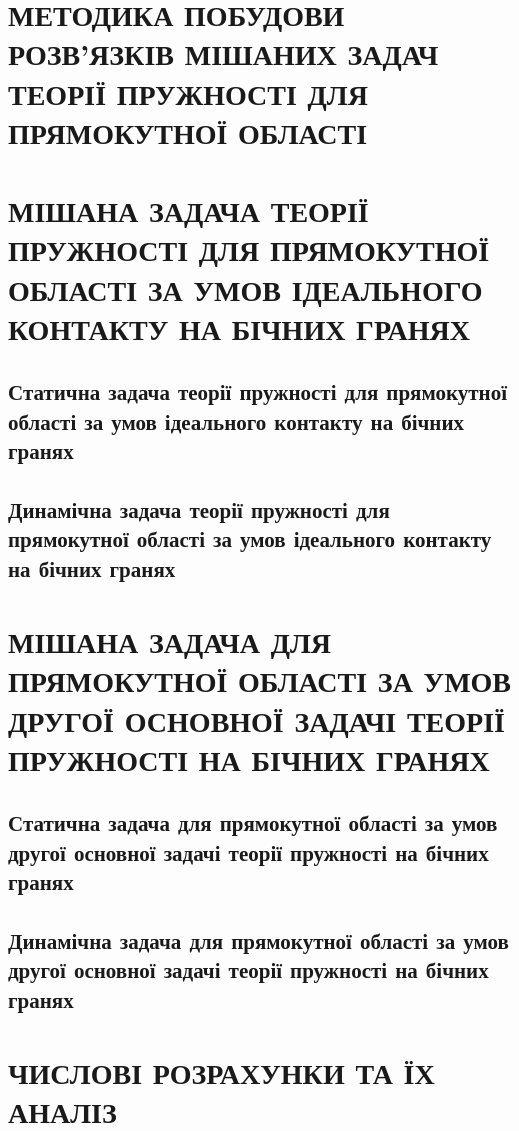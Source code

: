 \documentclass[a4paper,14pt]{extarticle}
\numberwithin{equation}{section}
\begin{document}
\section{МЕТОДИКА ПОБУДОВИ РОЗВ’ЯЗКІВ МІШАНИХ ЗАДАЧ ТЕОРІЇ ПРУЖНОСТІ ДЛЯ ПРЯМОКУТНОЇ ОБЛАСТІ}

\newpage

\section[МІШАНА ЗАДАЧА ТЕОРІЇ ПРУЖНОСТІ ДЛЯ ПРЯМОКУТНОЇ ОБЛАСТІ ЗА УМОВ ІДЕАЛЬНОГО КОНТАКТУ НА БІЧНИХ ГРАНЯХ]
{\centering МІШАНА ЗАДАЧА ТЕОРІЇ ПРУЖНОСТІ ДЛЯ ПРЯМОКУТНОЇ ОБЛАСТІ ЗА УМОВ ІДЕАЛЬНОГО КОНТАКТУ НА БІЧНИХ ГРАНЯХ}

\subsection{Статична задача теорії пружності для прямокутної області за умов ідеального контакту на бічних гранях}

\subsection{Динамічна задача теорії пружності для прямокутної області за умов ідеального контакту на бічних гранях}



\newpage

\section[МІШАНА ЗАДАЧА ДЛЯ ПРЯМОКУТНОЇ ОБЛАСТІ ЗА УМОВ ДРУГОЇ ОСНОВНОЇ ЗАДАЧІ ТЕОРІЇ ПРУЖНОСТІ НА БІЧНИХ ГРАНЯХ]
{\centering МІШАНА ЗАДАЧА ДЛЯ ПРЯМОКУТНОЇ ОБЛАСТІ ЗА УМОВ ДРУГОЇ ОСНОВНОЇ ЗАДАЧІ ТЕОРІЇ ПРУЖНОСТІ НА БІЧНИХ ГРАНЯХ}

\subsection{Статична задача для прямокутної області за умов другої основної задачі теорії пружності на бічних гранях}

\subsection{Динамічна задача для прямокутної області за умов другої основної задачі теорії пружності на бічних гранях}



\newpage

\section[ЧИСЛОВІ РОЗРАХУНКИ ТА ЇХ АНАЛІЗ]
{\centering ЧИСЛОВІ РОЗРАХУНКИ ТА ЇХ АНАЛІЗ}

\newpage
\end{document}

